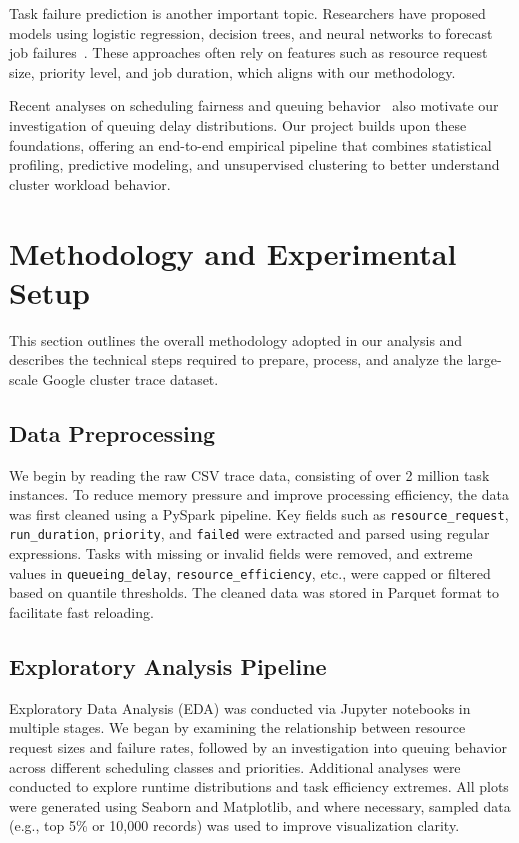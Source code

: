\documentclass[a4paper,12pt]{article}
\begin{document}
Task failure prediction is another important topic. Researchers have proposed models using logistic regression, decision trees, and neural networks to forecast job failures~\cite{gupta2014failure, vishwanath2010characterizing}. These approaches often rely on features such as resource request size, priority level, and job duration, which aligns with our methodology.

Recent analyses on scheduling fairness and queuing behavior~\cite{sharma2011cutting, delgado2016job} also motivate our investigation of queuing delay distributions. Our project builds upon these foundations, offering an end-to-end empirical pipeline that combines statistical profiling, predictive modeling, and unsupervised clustering to better understand cluster workload behavior.

\section{Methodology and Experimental Setup}

This section outlines the overall methodology adopted in our analysis and describes the technical steps required to prepare, process, and analyze the large-scale Google cluster trace dataset.

\subsection{Data Preprocessing}

We begin by reading the raw CSV trace data, consisting of over 2 million task instances. To reduce memory pressure and improve processing efficiency, the data was first cleaned using a PySpark pipeline. Key fields such as \texttt{resource\_request}, \texttt{run\_duration}, \texttt{priority}, and \texttt{failed} were extracted and parsed using regular expressions. Tasks with missing or invalid fields were removed, and extreme values in \texttt{queueing\_delay}, \texttt{resource\_efficiency}, etc., were capped or filtered based on quantile thresholds. The cleaned data was stored in Parquet format to facilitate fast reloading.

\subsection{Exploratory Analysis Pipeline}

Exploratory Data Analysis (EDA) was conducted via Jupyter notebooks in multiple stages. We began by examining the relationship between resource request sizes and failure rates, followed by an investigation into queuing behavior across different scheduling classes and priorities. Additional analyses were conducted to explore runtime distributions and task efficiency extremes. All plots were generated using Seaborn and Matplotlib, and where necessary, sampled data (e.g., top 5\% or 10,000 records) was used to improve visualization clarity.
\end{document}
